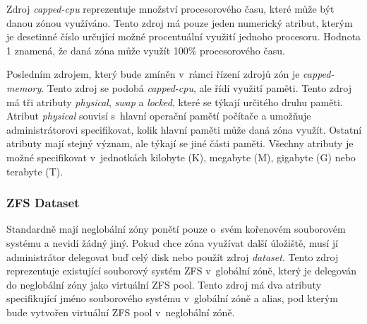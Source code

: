 Zdroj \textit{capped-cpu} reprezentuje množství procesorového času, které může být danou zónou využíváno. Tento zdroj má pouze
jeden numerický atribut, kterým je desetinné číslo určující možné procentuální využití jednoho procesoru. Hodnota 1 znamená,
že daná zóna může využít 100\% procesorového času.

Posledním zdrojem, který bude zmíněn v~rámci řízení zdrojů zón je \textit{capped-memory}. Tento zdroj se podobá \textit{capped-cpu},
ale řídí využití paměti. Tento zdroj má tři atributy \textit{physical}, \textit{swap} a \textit{locked}, které se týkají určitého
druhu paměti. Atribut \textit{physical} souvisí s~hlavní operační pamětí počítače a umožňuje administrátorovi specifikovat,
kolik hlavní paměti může daná zóna využít. Ostatní atributy mají stejný význam, ale týkají se jiné části paměti. Všechny 
atributy je možné specifikovat v~jednotkách kilobyte (K), megabyte (M), gigabyte (G) nebo terabyte (T).
\subsubsection{ZFS Dataset}
\label{chapter:zones:configuration:resources:dataset}
Standardně mají neglobální zóny ponětí pouze o~svém kořenovém souborovém systému a nevidí žádný jiný. Pokud chce zóna využívat
další úložiště, musí jí administrátor delegovat buď celý disk nebo použít zdroj \textit{dataset}. Tento zdroj reprezentuje
existující souborový systém ZFS v~globální zóně, který je delegován do neglobální zóny jako virtuální ZFS pool. Tento zdroj
má dva atributy specifikující jméno souborového systému v~globální zóně a alias, pod kterým bude vytvořen virtuální ZFS pool
v~neglobální zóně.
